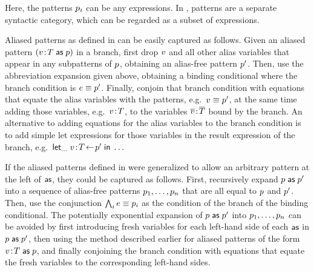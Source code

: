Here, the patterns $p_i$ can be any expressions. In \cite{lm}, patterns
are a separate syntactic category, which can be regarded as a subset of
expressions.

Aliased patterns as defined in \cite{lm} can be easily captured as
follows. Given an aliased pattern $(v\!:\!T\;\mathsf{as}\;p)$ in a branch, first drop $v$
and all other alias variables that appear in any subpatterns of $p$,
obtaining an alias-free pattern $p'$. Then, use the abbreviation
expansion given above, obtaining a binding conditional where the branch
condition is $e\equiv p'$. Finally, conjoin that branch condition
with equations that equate the alias variables with the patterns, e.g.\
$v\equiv p'$, at the same time adding those variables, e.g.\
$v\!:\!T$, to the variables $\overline{v}\!:\!\overline{T}$ bound by the
branch. An alternative to adding equations for the alias variables to the
branch condition is to add simple let expressions for those variables in the
result expression of the branch, e.g.\
$\mathsf{let}_{\ldots}\;v\!:\!T\!\gets\!p'\;\mathsf{in}\;\ldots$

If the aliased patterns defined in \cite{lm} were generalized to allow an
arbitrary pattern at the left of $\mathsf{as}$, they could be captured as follows.
First, recursively expand $p\;\mathsf{as}\;p'$ into a sequence of alias-free patterns
$p_1,\ldots,p_n$ that are all equal to $p$ and
$p'$. Then, use the conjunction $\bigwedge_{i}e\equiv p_i$ as the
condition of the branch of the binding conditional. The potentially
exponential expansion of $p\;\mathsf{as}\;p'$ into $p_1,\ldots,p_n$ can be
avoided by first introducing fresh variables for each left-hand side of each
$\mathsf{as}$ in $p\;\mathsf{as}\;p'$, then using the method described earlier for aliased
patterns of the form $v\!:\!T\;\mathsf{as}\;p$, and finally conjoining the branch condition
with equations that equate the fresh variables to the corresponding left-hand
sides.


